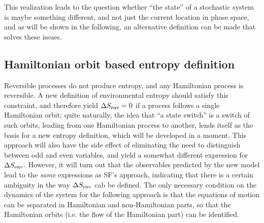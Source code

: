 This realization leads to the question whether ``the state'' of a stochastic system is maybe something different, and not just the current location in phase space, and as will be shown in the following, an alternative definition can be made that solves these issues.

\subsection{Hamiltonian orbit based entropy definition}
\label{sec:flow entropy}

Reversible processes do not produce entropy, and any Hamiltonian process is reversible. A new definition of environmental entropy should satisfy this constraint, and therefore yield \(\Delta S_\text{env} = 0\) if a process follows a single Hamiltonian orbit; quite naturally, the idea that ``a state switch'' is a switch of such orbits, leading from one Hamiltonian process to another, lends itself as the basis for a new entropy definition, which will be developed in a moment. This approach will also have the side effect of eliminating the need to distinguish between odd and even variables, and yield a somewhat different expression for \(\Delta S_\text{env}\). However, it will turn out that the observables predicted by the new model lead to the \emph{same} expressions as SF's approach, indicating that there is a certain ambiguity in the way \(\Delta S_\text{env}\) cab be defined. The only necessary condition on the dynamics of the system for the following approach is that the equations of motion can be separated in Hamiltonian and non-Hamiltonian parts, so that the Hamiltonian orbits (i.e. the flow of the Hamiltonian part) can be identified.

